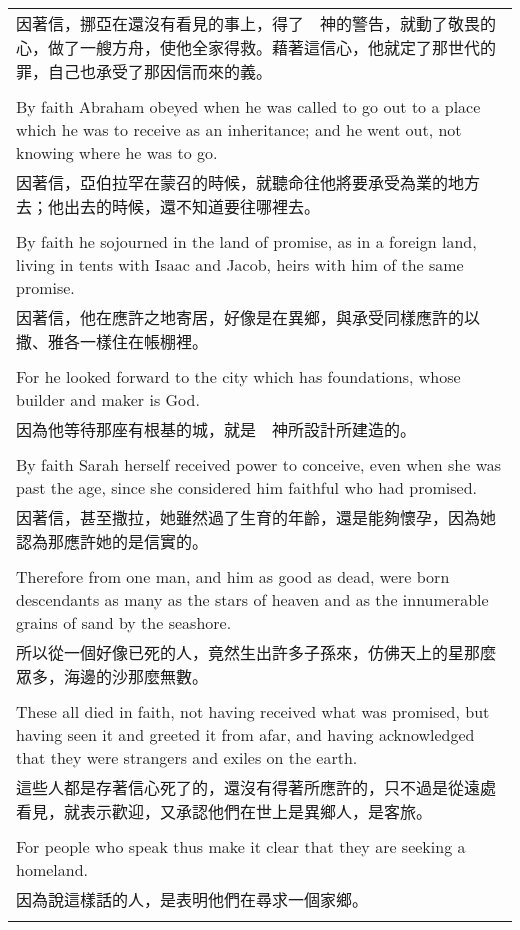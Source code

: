 \begin{tabularx}{\textwidth}{p{}}
因著信，挪亞在還沒有看見的事上，得了　神的警告，就動了敬畏的心，做了一艘方舟，使他全家得救。藉著這信心，他就定了那世代的罪，自己也承受了那因信而來的義。 \\ \\
By faith Abraham obeyed when he was called to go out to a place which he was to receive as an inheritance; and he went out, not knowing where he was to go. \\
因著信，亞伯拉罕在蒙召的時候，就聽命往他將要承受為業的地方去；他出去的時候，還不知道要往哪裡去。 \\ \\
By faith he sojourned in the land of promise, as in a foreign land, living in tents with Isaac and Jacob, heirs with him of the same promise. \\
因著信，他在應許之地寄居，好像是在異鄉，與承受同樣應許的以撒、雅各一樣住在帳棚裡。 \\ \\
For he looked forward to the city which has foundations, whose builder and maker is God. \\
因為他等待那座有根基的城，就是　神所設計所建造的。 \\ \\
By faith Sarah herself received power to conceive, even when she was past the age, since she considered him faithful who had promised. \\
因著信，甚至撒拉，她雖然過了生育的年齡，還是能夠懷孕，因為她認為那應許她的是信實的。 \\ \\
Therefore from one man, and him as good as dead, were born descendants as many as the stars of heaven and as the innumerable grains of sand by the seashore. \\
所以從一個好像已死的人，竟然生出許多子孫來，仿佛天上的星那麼眾多，海邊的沙那麼無數。 \\ \\
These all died in faith, not having received what was promised, but having seen it and greeted it from afar, and having acknowledged that they were strangers and exiles on the earth. \\
這些人都是存著信心死了的，還沒有得著所應許的，只不過是從遠處看見，就表示歡迎，又承認他們在世上是異鄉人，是客旅。 \\ \\
For people who speak thus make it clear that they are seeking a homeland. \\
因為說這樣話的人，是表明他們在尋求一個家鄉。 \\ \\

\end{tabularx}

